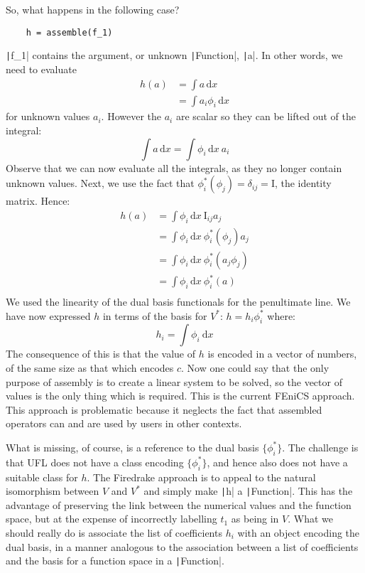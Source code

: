 \documentclass[a4paper,11pt]{article}
\begin{document}
So, what happens in the following case?
\begin{verbatim}
    h = assemble(f_1)
\end{verbatim}
\texttt|f_1| contains the argument, or unknown \texttt|Function|, \texttt|a|. In other words, we need to evaluate
\begin{equation}
    \begin{split}
        h(a) &= \int a\,\mathrm{d}x\\
        &= \int a_i \phi_i\,\mathrm{d}x
    \end{split}
\end{equation}
for unknown values $a_i$. However the $a_i$ are scalar so they can be lifted out of the integral:
\begin{equation}
    \int a\,\mathrm{d}x = \int \phi_i\,\mathrm{d}x\ a_i
\end{equation}
Observe that we can now evaluate all the integrals, as they no longer contain unknown values. 
Next, we use the fact that $\phi^*_i(\phi_j) = \delta_{ij} = \mathrm{I}$, the identity matrix. Hence:
\begin{equation}
    \begin{split}
        h(a) &= \int \phi_i\,\mathrm{d}x\ \mathrm{I}_{ij} a_j\\
        &= \int \phi_i\,\mathrm{d}x\ \phi^*_i(\phi_j) a_j\\
        &= \int \phi_i\,\mathrm{d}x\ \phi^*_i(a_j\phi_j)\\
        &= \int \phi_i\,\mathrm{d}x\ \phi^*_i(a)\\
    \end{split}
\end{equation}
We used the linearity of the dual basis functionals for the penultimate line. We have now expressed $h$ in terms of the basis for $V^*$: $h = h_i \phi^*_i$ where:
\begin{equation}
    h_i = \int \phi_i\ \mathrm{d}x
\end{equation}
The consequence of this is that the value of $h$ is encoded in a vector of numbers, of the same size as that which encodes $c$. Now one could say that the only purpose of assembly is to create a linear system to be solved, so the vector of values is the only thing which is required. This is the current FEniCS approach. This approach is problematic because it neglects the fact that assembled operators can and are used by users in other contexts. 

What is missing, of course, is a reference to the dual basis $\{\phi^*_i\}$. The challenge is that UFL does not have a class encoding $\{\phi^*_i\}$, and hence also does not have a suitable class for $h$. The Firedrake approach is to appeal to the natural isomorphism between $V$ and $V^*$ and simply make \texttt|h| a \texttt|Function|. This has the advantage of preserving the link between the numerical values and the function space, but at the expense of incorrectly labelling $t_1$ as being in $V$. What we should really do is associate the list of coefficients $h_i$ with an object encoding the dual basis, in a manner analogous to the association between a list of coefficients and the basis for a function space in a \texttt|Function|. 
\end{document}
